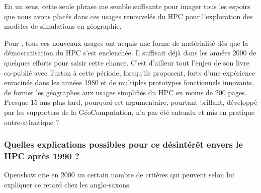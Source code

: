 En un sens, cette seule phrase me semble suffisante pour imager tous les espoirs que nous avons placés dans ces usages renouvelés du HPC pour l'exploration des modèles de simulations en géographie.

Pour \textcite{Openshaw2000}, tous ces nouveaux usages ont acquis une forme de matérialité dès que la démocratisation du HPC s'est enclenchée. Il suffisait déjà dans les années 2000 de quelques efforts pour saisir cette chance. C'est d'ailleur tout l'enjeu de son livre co-publié avec Turton à cette période, lorsqu'ils proposent, forts d'une expérience enracinée dans les années 1980 et de multiples prototypes fonctionnels innovants, de former les géographes aux usages simplifiés du HPC en moins de 200 pages. Presque 15 ans plus tard,  pourquoi cet argumentaire, pourtant brillant, développé par les supporters de la GéoComputation, n'a pas été entendu et mis en pratique outre-atlantique ?



\subsubsection{Quelles explications possibles pour ce désintérêt envers le HPC après 1990 ? }
\label{sssec:desertionHPC}

Openshaw cite en 2000 un certain nombre de critères qui peuvent selon lui expliquer ce retard chez les anglo-saxons.

